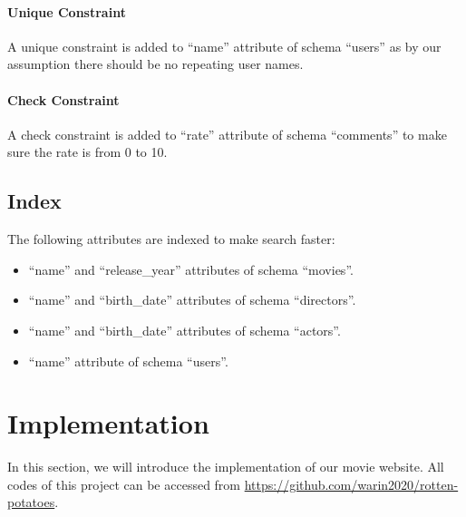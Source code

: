 \begin{CJK*}{UTF8}{gbsn}
\paragraph{Unique Constraint}
A unique constraint is added to ``name'' attribute of schema ``users'' as by our assumption there should be no repeating user names. 
\paragraph{Check Constraint}
A check constraint is added to ``rate'' attribute of schema ``comments'' to make sure the rate is from 0 to 10.

\subsection{Index}
The following attributes are indexed to make search faster:
\begin{itemize}
\item ``name'' and ``release\_year'' attributes of schema ``movies''.
\item ``name'' and ``birth\_date'' attributes of schema ``directors''.
\item ``name'' and ``birth\_date'' attributes of schema ``actors''.
\item ``name'' attribute of schema ``users''.
\end{itemize}

\section{Implementation}
In this section, we will introduce the implementation of our movie website. All codes of this project can be accessed from \href{https://github.com/warin2020/rotten-potatoes}{https://github.com/warin2020/rotten-potatoes}.

\end{CJK*}
